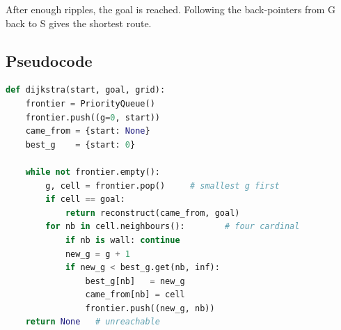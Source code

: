 \documentclass[11pt,a4paper]{article}
\newcommand{\gridbase}[2]{%
  \draw[step=0.6,gray!50,very thin] (0,0) grid (#1*0.6,#2*0.6);
  \draw[black,thick] (0,0) rectangle (#1*0.6,#2*0.6);
}
\newcommand{\fillcell}[3]{%
  \fill[#3] (#1*0.6,#2*0.6) rectangle ({(#1+1)*0.6},{(#2+1)*0.6});
  \draw[gray!50,very thin] (#1*0.6,#2*0.6) rectangle ({(#1+1)*0.6},{(#2+1)*0.6});
}
\newcommand{\celltext}[3]{%
  \node at ({(#1+0.5)*0.6},{(#2+0.5)*0.6}) {\footnotesize #3};
}
\begin{document}
\begin{center}
\end{center}

\noindent After enough ripples, the goal is reached. Following the back-pointers from G back to S gives the shortest route.

\subsection{Pseudocode}
\begin{lstlisting}[language=Python]
def dijkstra(start, goal, grid):
    frontier = PriorityQueue()
    frontier.push((g=0, start))
    came_from = {start: None}
    best_g    = {start: 0}

    while not frontier.empty():
        g, cell = frontier.pop()     # smallest g first
        if cell == goal:
            return reconstruct(came_from, goal)
        for nb in cell.neighbours():        # four cardinal
            if nb is wall: continue
            new_g = g + 1
            if new_g < best_g.get(nb, inf):
                best_g[nb]   = new_g
                came_from[nb] = cell
                frontier.push((new_g, nb))
    return None   # unreachable
\end{lstlisting}
\end{document}
